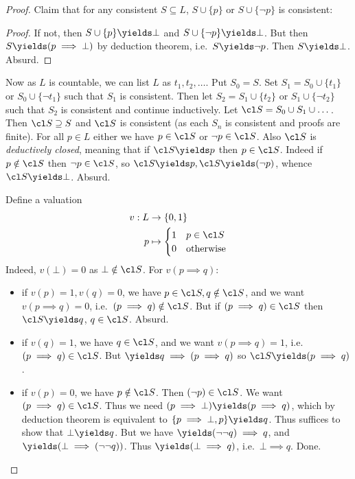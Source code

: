 \documentclass[a4paper]{article}
\begin{document}
\begin{proof}
  Claim that for any consistent \(S \subseteq L\), \(S \cup \{p\}\) or \(S \cup \{\neg p\}\) is consistent:

  \begin{proof}
    If not, then \(S \cup \{p\} \yields \bot\) and \(S \cup \{\neg p\} \yields \bot\). But then \(S \yields (p \implies \bot)\) by deduction theorem, i.e.\ \(S \yields \neg p\). Then \(S \yields \bot\). Absurd.
  \end{proof}

  Now as \(L\) is countable, we can list \(L\) as \(t_1, t_2, \dots \). Put \(S_0 = S\). Set \(S_1 = S_0 \cup \{t_1\}\) or \(S_0 \cup \{\neg t_1\}\) such that \(S_1\) is consistent. Then let \(S_2 = S_1 \cup \{t_2\}\) or \(S_1 \cup \{\neg t_2\}\) such that \(S_2\) is consistent and continue inductively. Let \(\cl S = S_0 \cup S_1 \cup \dots\). Then \(\cl S \supseteq S\) and \(\cl S\) is consistent (as each \(S_n\) is consistent and proofs are finite). For all \(p \in L\) either we have \(p \in \cl S\) or \(\neg p \in \cl S\). Also \(\cl S\) is \emph{deductively closed}, meaning that if \(\cl S \yields p\) then \(p \in \cl S\). Indeed if \(p \notin \cl S\) then \(\neg p \in \cl S\), so \(\cl S \yields p, \cl S \yields (\neg p)\), whence \(\cl S \yields \bot\). Absurd.

  Define a valuation
  \begin{align*}
    v: L &\to \{0, 1\} \\
    p &\mapsto
        \begin{cases}
          1 & p \in \cl S \\
          0 & \text{otherwise}
        \end{cases}
  \end{align*}
  Indeed, \(v(\bot) = 0\) as \(\bot \notin \cl S\). For \(v(p \implies q)\):
  \begin{itemize}
  \item if \(v(p) = 1, v(q) = 0\), we have \(p \in \cl S, q \notin \cl S\), and we want \(v(p \implies q) = 0\), i.e.\ \((p \implies q) \notin \cl S\). But if \((p \implies q) \in \cl S\) then \(\cl S \yields q\), \(q \in \cl S\). Absurd.
  \item if \(v(q) = 1\), we have \(q \in \cl S\), and we want \(v(p \implies q) = 1\), i.e.\ \((p \implies q) \in \cl S\). But \(\yields q \implies (p \implies q)\) so \(\cl S \yields (p \implies q)\).
  \item if \(v(p) = 0\), we have \(p \notin \cl S\). Then \((\neg p) \in \cl S\). We want \((p \implies q) \in \cl S\). Thus we need \((p \implies \bot) \yields (p \implies q)\), which by deduction theorem is equivalent to \(\{p \implies \bot, p\} \yields q\). Thus suffices to show that \(\bot \yields q\). But we have \(\yields (\neg \neg q) \implies q\), and \(\yields (\bot \implies (\neg \neg q))\). Thus \(\yields (\bot \implies q)\), i.e.\ \(\bot \implies q\). Done.
  \end{itemize}
\end{proof}
\end{document}
